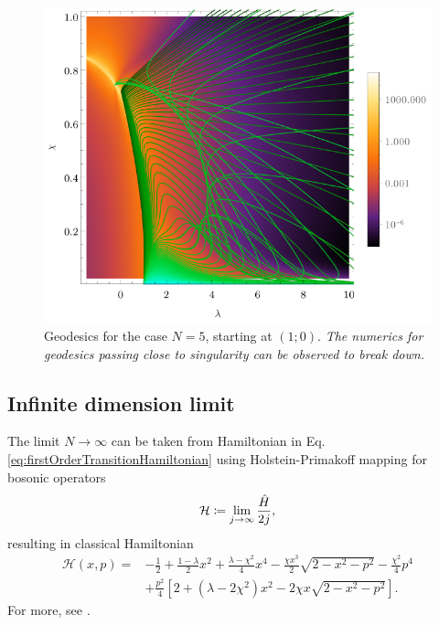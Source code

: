 \begin{figure}[H]
    \centering
    \includegraphics[scale=1.3]{../img/N=5_geods00.pdf}
    \caption{Geodesics for the case $N=5$, starting at $(1;0)$. \emph{The numerics for geodesics passing close to singularity can be observed to break down.}}
    \label{fig:geod10}    
\end{figure}







\subsection{Infinite dimension limit}
\label{chap:infiniteDimensionLimit}
The limit $N\rightarrow \infty$ can be taken from Hamiltonian in Eq. \ref{eq:firstOrderTransitionHamiltonian} using Holstein-Primakoff mapping \citet{holstein} for bosonic operators
\begin{equation}
    \mathcal{H}\coloneqq\lim_{j\rightarrow\infty}\frac{\hat{H}}{2j},
\end{equation}
resulting in classical Hamiltonian
\begin{equation}
    \begin{split}
        \mathcal{H}(x,p)=&-\frac{1}{2}+\frac{1-\lambda}{2}x^2+\frac{\lambda-\chi^2}{4}x^4-\frac{\chi x^3}{2}\sqrt{2-x^2-p^2}-\frac{\chi^2}{4}p^4\\
        &+\frac{p^2}{4}\left[2+(\lambda-2\chi^2)x^2-2\chi x\sqrt{2-x^2-p^2}\right].
    \end{split}
    \label{eq:HamiltonianClassicalLimit}
\end{equation}
For more, see \citet{felipe}.

